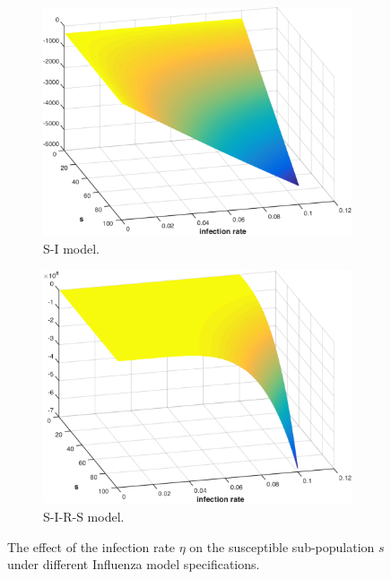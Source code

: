 \begin{figure}[h!]
    \centering
    \begin{subfigure}[b]{0.5\textwidth}    
        \centering
        \includegraphics[width=0.8\linewidth, height=0.55\linewidth]{images/sd_infection_s}
        \caption{S-I model.}
        \label{fig:influenza_sd_value_function}
        \vspace{1em}
    \end{subfigure}  
    \begin{subfigure}[b]{0.5\textwidth}    
        \centering
        \includegraphics[width=0.8\linewidth, height=0.55\linewidth]{images/sir_infection_s}
        \caption{S-I-R-S model.}
        \label{fig:influenza_sirs_value_function}
        \vspace{1em}
       \end{subfigure}         
    \caption{The effect of the infection rate {\footnotesize $\eta$} on the susceptible sub-population {\footnotesize $s$} under different Influenza model specifications.}
    \label{fig:influenza_value_function}    
\end{figure}


